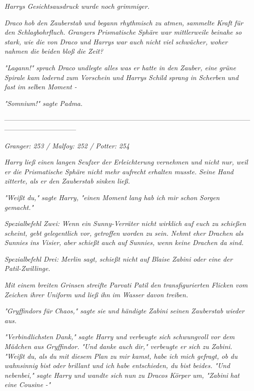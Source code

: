 {\emph{Harrys Gesichtsausdruck wurde noch grimmiger.}

\emph{Draco hob den Zauberstab und begann rhythmisch zu atmen, sammelte Kraft für den Schlagbohrfluch. Grangers Prismatische Sphäre war mittlerweile beinahe so stark, wie die von Draco und Harrys war auch nicht viel schwächer, woher} \emph{nahmen die beiden bloß die Zeit?}

\emph{"\emph{Lagann!}" sprach Draco} \emph{undlegte alles was er hatte in den Zauber, eine} \emph{grüne Spirale kam lodernd zum Vorschein und Harrys Schild} \emph{sprang in Scherben und fast im selben Moment -}

\emph{"\emph{Somnium!}" sagte Padma.}

--------------------------------------------------------------------------------------------------------------------------------------------

\emph{Granger: 253 / Malfoy: 252 / Potter: 254}

\emph{Harry ließ einen langen Seufzer der Erleichterung vernehmen und nicht nur, weil er die Prismatische Sphäre nicht mehr aufrecht} \emph{erhalten musste. Seine Hand zitterte, als er den Zauberstab sinken ließ.}

\emph{"Weißt du," sagte Harry, "einen Moment lang hab ich mir schon Sorgen gemacht."}

\emph{Spezialbefehl Zwei: Wenn ein Sunny-Verräter nicht wirklich auf euch zu schießen scheint, gebt gelegentlich vor, getroffen worden zu sein. Nehmt eher Drachen als Sunnies ins Visier, aber schießt auch auf Sunnies, wenn keine Drachen da sind.}

\emph{\emph{Spezialbefehl Drei: Merlin sagt, schießt nicht auf Blaise Zabini oder eine der Patil-Zwillinge.}}

\emph{Mit einem breiten Grinsen streifte Parvati Patil den transfigurierten Flicken vom Zeichen ihrer Uniform und ließ ihn im Wasser davon treiben.}

\emph{"Gryffindors für Chaos," sagte sie und händigte Zabini seinen Zauberstab wieder aus.}

\emph{"\emph{Verbindlichsten}} \emph{Dank," sagte Harry und verbeugte sich schwungvoll vor dem Mädchen aus Gryffindor. "Und} \emph{danke} \emph{auch} \emph{\emph{dir,}" verbeugte er sich zu Zabini. "Weißt du, als du mit diesem Plan zu mir kamst, habe ich mich gefragt, ob du wahnsinnig bist oder brillant und ich habe entschieden, du bist beides. "Und nebenbei," sagte Harry und wandte sich nun zu Dracos Körper um, "Zabini} \emph{\emph{hat}} \emph{eine Cousine -"}

}
